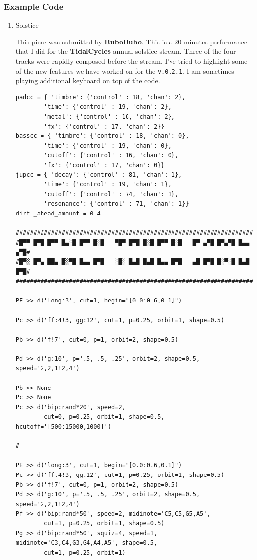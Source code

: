 \documentclass[11pt]{article}
\begin{document}
\subsubsection{Example Code}
\label{sec:org803e69e}
\begin{enumerate}
\item Solstice
\label{sec:orgcf84fdd}

This piece was submitted by \textbf{BuboBubo}. This is a 20 minutes performance that I did for the \textbf{TidalCycles} annual solstice stream. Three of the four tracks were rapidly composed before the stream. I've tried to highlight some of the new features we have worked on for the \texttt{v.0.2.1}. I am sometimes playing additional keyboard on top of the code.

\begin{verbatim}
padcc = { 'timbre': {'control' : 18, 'chan': 2},
        'time': {'control' : 19, 'chan': 2},
        'metal': {'control' : 16, 'chan': 2},
        'fx': {'control' : 17, 'chan': 2}}
basscc = { 'timbre': {'control' : 18, 'chan': 0},
        'time': {'control' : 19, 'chan': 0},
        'cutoff': {'control' : 16, 'chan': 0},
        'fx': {'control' : 17, 'chan': 0}}
jupcc = { 'decay': {'control' : 81, 'chan': 1},
        'time': {'control' : 19, 'chan': 1},
        'cutoff': {'control' : 74, 'chan': 1},
        'resonance': {'control' : 71, 'chan': 1}}
dirt._ahead_amount = 0.4

#######################################################################
#█▀▀ █▀█ █▀▀ █▄░█ █▀▀ █░█   ▀█▀ █▀█ █░█ █▀▀ █░█   █▀ ▄▀█ █▀▄▀█ █▄▄ ▄▀█#
#█▀░ █▀▄ ██▄ █░▀█ █▄▄ █▀█   ░█░ █▄█ █▄█ █▄▄ █▀█   ▄█ █▀█ █░▀░█ █▄█ █▀█#
#######################################################################

PE >> d('long:3', cut=1, begin="[0.0:0.6,0.1]")

Pc >> d('ff:4!3, gg:12', cut=1, p=0.25, orbit=1, shape=0.5)

Pb >> d('f!7', cut=0, p=1, orbit=2, shape=0.5)

Pd >> d('g:10', p='.5, .5, .25', orbit=2, shape=0.5, speed='2,2,1!2,4')

Pb >> None
Pc >> None
Pc >> d('bip:rand*20', speed=2,
        cut=0, p=0.25, orbit=1, shape=0.5, hcutoff='[500:15000,1000]')

# ---

PE >> d('long:3', cut=1, begin="[0.0:0.6,0.1]")
Pc >> d('ff:4!3, gg:12', cut=1, p=0.25, orbit=1, shape=0.5)
Pb >> d('f!7', cut=0, p=1, orbit=2, shape=0.5)
Pd >> d('g:10', p='.5, .5, .25', orbit=2, shape=0.5, speed='2,2,1!2,4')
Pf >> d('bip:rand*50', speed=2, midinote='C5,C5,G5,A5',
        cut=1, p=0.25, orbit=1, shape=0.5)
Pg >> d('bip:rand*50', squiz=4, speed=1, midinote='C3,C4,G3,G4,A4,A5', shape=0.5,
        cut=1, p=0.25, orbit=1)


\end{verbatim}
\end{enumerate}
\end{document}
